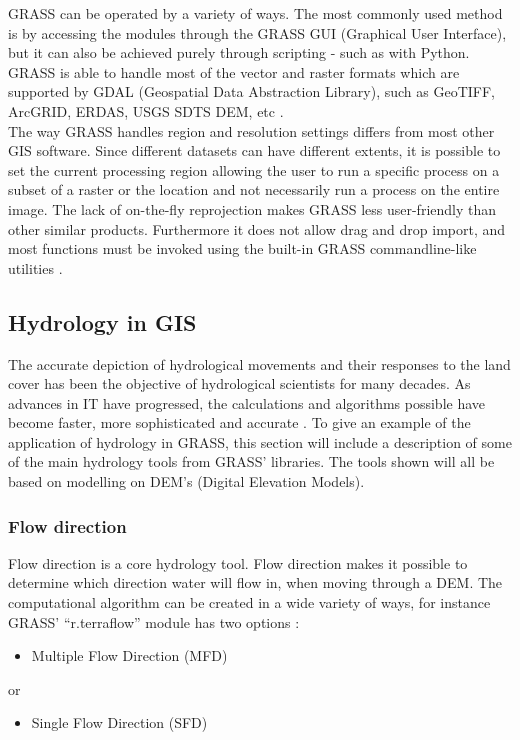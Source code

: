 GRASS can be operated by a variety of ways. The most commonly used method is by accessing the modules through the GRASS GUI (Graphical User Interface), but it can also be achieved purely through scripting - such as with Python. GRASS is able to handle most of the vector and raster formats which are supported by GDAL (Geospatial Data Abstraction Library), such as GeoTIFF, ArcGRID, ERDAS, USGS SDTS DEM, etc \citep{GRASSGIS}.\\

The way GRASS handles region and resolution settings differs from most other GIS software. Since different datasets can have different extents, it is possible to set the current processing region allowing the user to run a specific process on a subset of a raster or the location and not necessarily run a process on the entire image. 
The lack of on-the-fly reprojection makes GRASS less user-friendly than other similar products. Furthermore it does not allow drag and drop import, and most functions must be invoked using the built-in GRASS commandline-like utilities \citep{grassbook}.

\subsection{Hydrology in GIS}

The accurate depiction of hydrological movements and their responses to the land cover has been the objective of hydrological scientists for many decades. As advances in IT have progressed, the calculations and algorithms possible have become faster, more sophisticated and accurate \citep{hydrogis}.
To give an example of the application of hydrology in GRASS, this section will include a description of some of the main hydrology tools from GRASS' libraries. The tools shown will all be based on modelling on DEM's (Digital Elevation Models).

\subsubsection{Flow direction}
Flow direction is a core hydrology tool. Flow direction makes it possible to determine which direction water will flow in, when moving through a DEM. The computational algorithm can be created in a wide variety of ways, for instance GRASS' “r.terraflow” module has two options \citep{sfdmfd}: 

\begin{itemize}
\item Multiple Flow Direction (MFD) 
\end{itemize}
or 
\begin{itemize}
\item Single Flow Direction (SFD)
\end{itemize}
 

